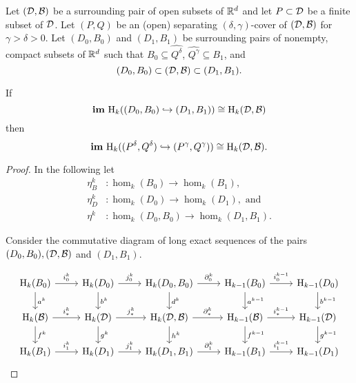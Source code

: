 
\begin{theorem}\label{thm:main}
  Let $({\mathcal{D}}, {\mathcal{B}})$ be a surrounding pair of open subsets of $\mathbb{R}^d$ and let $P\subset {\mathcal{D}}$ be a finite subset of ${\mathcal{D}}$.
  Let $(P, Q)$ be an (open) separating $(\delta,\gamma)$-cover of $({\mathcal{D}}, {\mathcal{B}})$ for $\gamma > \delta > 0$.
  Let $(D_0, B_0)$ and $(D_1, B_1)$ be surrounding pairs of nonempty, compact subsets of $\mathbb{R}^d$ such that $B_0\subseteq \hat{Q^\delta}$, $\hat{Q^\gamma}\subseteq B_1$, and
  \[ (D_0, B_0)\subset ({\mathcal{D}}, {\mathcal{B}}) \subset (D_1, B_1).\]

  If
  \[\mathbf{im}~\mathrm{H}_k((D_0, B_0)\hookrightarrow (D_1, B_1))\cong \mathrm{H}_k({\mathcal{D}}, {\mathcal{B}})\]
  then
  \[\mathbf{im}~\mathrm{H}_k((P^\delta, Q^\delta)\hookrightarrow (P^\gamma, Q^\gamma))\cong \mathrm{H}_k({\mathcal{D}}, {\mathcal{B}}).\]
\end{theorem}
\begin{proof}

  In the following let
  \begin{align*}
    \eta_B^k &: \hom_k(B_0)\to \hom_k(B_1),\\
    \eta_D^k &: \hom_k(D_0)\to \hom_k(D_1),\text{ and }\\
    \eta^k &: \hom_k(D_0, B_0)\to \hom_k(D_1, B_1).
  \end{align*}

  Consider the commutative diagram of long exact sequences of the pairs $(D_0, B_0), ({\mathcal{D}}, {\mathcal{B}})$ and $(D_1, B_1)$.

  \begin{equation}\begin{tikzcd}
      \hom_k(B_0)\arrow{r}{i^k_0}\arrow{d}{a^k} &
      \hom_k(D_0)\arrow{r}{j^k_0} \arrow{d}{b^k} &
      \hom_k(D_0, B_0)\arrow{r}{\partial^k_0}\arrow{d}{d^k} &
      \hom_{k-1}(B_0)\arrow{r}{i^{k-1}_0}\arrow{d}{a^{k-1}} &
      \hom_{k-1}(D_0) \arrow{d}{b^{k-1}}\\
      \hom_k(\B)\arrow{r}{i_*^k}\arrow{d}{f^k} &
      \hom_k(\D)\arrow{r}{j_*^k}\arrow{d}{g^k} &
      \hom_k(\D, \B)\arrow{r}{\partial_*^k}\arrow{d}{h^k} &
      \hom_{k-1}(\B)\arrow{r}{i_*^{k-1}}\arrow{d}{f^{k-1}} &
      \hom_{k-1}(\D)\arrow{d}{g^{k-1}}\\
      \hom_k(B_1)\arrow{r}{i^k_1} &
      \hom_k(D_1)\arrow{r}{j^k_1} &
      \hom_k(D_1, B_1)\arrow{r}{\partial^k_1} &
      \hom_{k-1}(B_1)\arrow{r}{i^{k-1}_1} &
      \hom_{k-1}(D_1)
  \end{tikzcd}\end{equation}


\end{proof}
